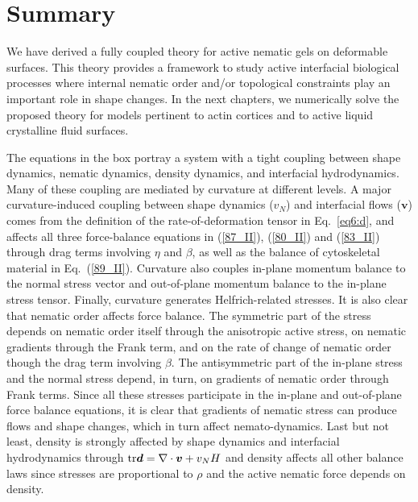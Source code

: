 			\section{Summary} \label{sec4_2_4}
			
			We have derived a fully coupled theory for active nematic gels on deformable surfaces. This theory provides a framework to study active interfacial biological processes where internal nematic order and/or topological constraints play an important role in shape changes. In the next chapters, we numerically solve the proposed theory for models pertinent to actin cortices and to active liquid crystalline fluid surfaces. 
			
			The equations in the box portray a system with a tight coupling between shape dynamics, nematic dynamics, density dynamics, and interfacial hydrodynamics. Many of these coupling are mediated by curvature at different levels. A major curvature-induced coupling between shape dynamics ($v_N$) and interfacial flows ($\bm{v}$) comes from the definition of the rate-of-deformation tensor in Eq.~\eqref{eq6:d}, and affects all three force-balance equations in (\ref{87_II}), (\ref{80_II}) and (\ref{83_II}) through drag terms involving $\eta$ and $\beta$, as well as the balance of cytoskeletal material in Eq.~(\ref{89_II}). Curvature also couples in-plane momentum balance to the normal stress vector and out-of-plane momentum balance to the in-plane stress tensor. Finally, curvature generates Helfrich-related stresses. It is also clear that nematic order affects force balance. The symmetric part of the stress depends on nematic order itself through the anisotropic active stress, on nematic gradients through the Frank term, and on the rate of change of nematic order though the drag term involving $\beta$. The antisymmetric part of the in-plane stress and the normal stress depend, in turn, on gradients of nematic order through Frank terms. Since all these stresses participate in the in-plane and out-of-plane force balance equations, it is clear that gradients of nematic stress can produce flows and shape changes, which in turn affect nemato-dynamics. Last but not least, density is strongly affected by shape dynamics and interfacial hydrodynamics through $ \textup{tr}\bm{d} =  \nabla \cdot \bm{v} + v_N H$ and density affects all other balance laws since stresses are proportional to $\rho$ and the active nematic force depends on density.
			

